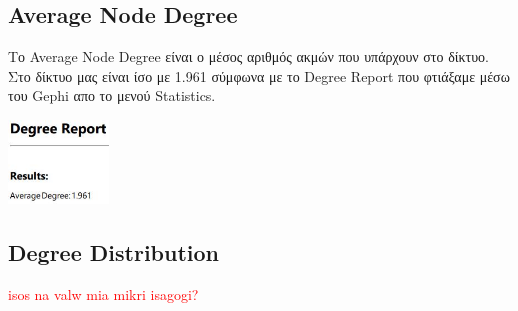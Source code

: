 \documentclass[12pt]{article}
\begin{document}
	\subsection{Average Node Degree}
	Το Average Node Degree είναι ο μέσος αριθμός ακμών που υπάρχουν στο δίκτυο. Στο δίκτυο μας είναι ίσο με 1.961 σύμφωνα με το Degree Report που φτιάξαμε μέσω του Gephi απο το μενού Statistics.
	\begin{center}
		\includegraphics[width=0.2\textwidth]{photos-files/section6/average_degree.JPG}
	\end{center}
	
	\newpage
	\subsection{Degree Distribution} %
	\textcolor{red}{isos na valw mia mikri isagogi?}
	
\end{document}
